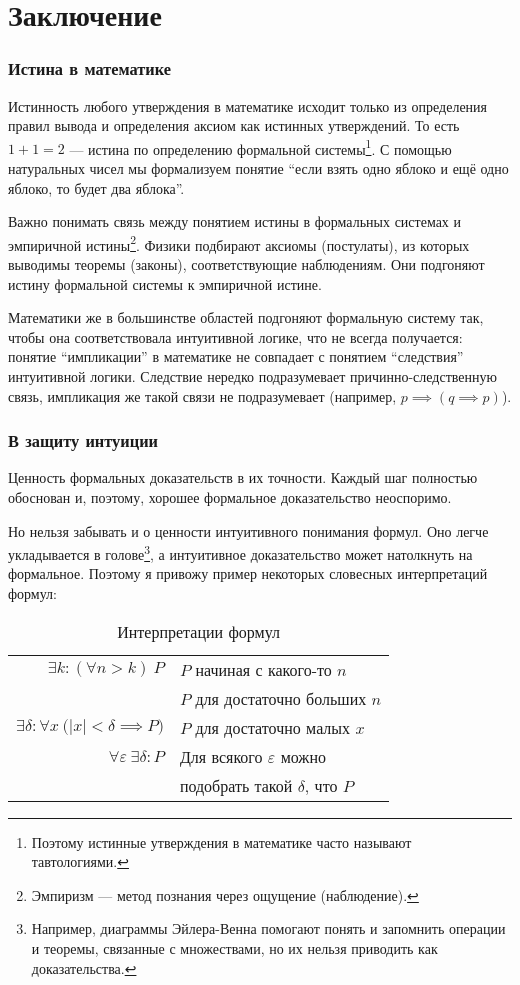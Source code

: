 \part{Заключение}

\section{Истина в математике}

Истинность любого утверждения в математике исходит только из определения правил
вывода и определения аксиом как истинных утверждений.
То есть $1+1=2$ --- истина по определению формальной системы\footnote{
	Поэтому истинные утверждения в математике часто называют тавтологиями.
}.
С помощью натуральных чисел мы формализуем понятие ``если взять одно яблоко
и ещё одно яблоко, то будет два яблока''.

Важно понимать связь между понятием истины в формальных системах
и эмпиричной истины\footnote{Эмпиризм --- метод познания через ощущение (наблюдение).}.
Физики подбирают аксиомы (постулаты),
из которых выводимы теоремы (законы), соответствующие наблюдениям.
Они подгоняют истину формальной системы к эмпиричной истине.

Математики же
в большинстве областей подгоняют формальную систему так,
чтобы она соответствовала интуитивной логике,
что не всегда получается: понятие ``импликации'' в математике не совпадает
с понятием ``следствия'' интуитивной логики. Следствие
нередко подразумевает причинно-следственную
связь, импликация же такой связи не подразумевает (например, ${p\implies(q\implies p)}$).

\section{В защиту интуиции}

Ценность формальных доказательств в их точности. Каждый шаг полностью обоснован и,
поэтому, хорошее формальное доказательство неоспоримо.

Но нельзя забывать и о ценности интуитивного понимания формул.
Оно легче укладывается в голове\footnote{Например, диаграммы
	Эйлера-Венна помогают понять и запомнить операции и теоремы, связанные с
	множествами, но их нельзя приводить как доказательства.},
а интуитивное доказательство может натолкнуть на формальное. Поэтому я привожу пример
некоторых словесных интерпретаций формул:
\begin{table}
	\centering
	\begin{tabular}{r|l}
		$\exists k:(\forall n>k)~P$     & $P$ начиная с какого-то $n$       \\
		                                & $P$ для достаточно больших $n$    \\[1em]
		$\exists \delta:\forall x~
		\big(|x|<\delta\implies P\big)$ & $P$ для достаточно малых $x$      \\[1em]
		$\forall \varepsilon~
		\exists \delta:P$               & Для всякого $\varepsilon$ можно   \\
		                                & подобрать такой $\delta$, что $P$
	\end{tabular}
	\caption{Интерпретации формул}\label{table:formula_interp}
\end{table}

